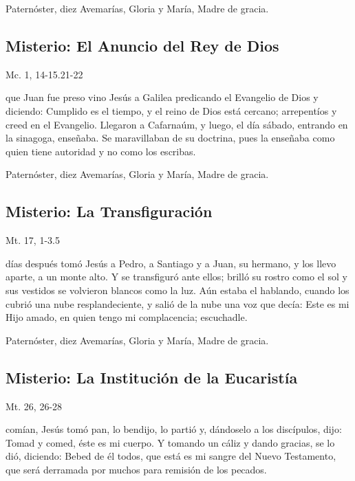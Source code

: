 \documentclass[./main.tex]{subfiles}
\newcounter{lux-counter}
\begin{document}
\begin{center}
      Paternóster, diez Avemarías, Gloria y María, Madre de gracia.
\end{center}

\subsection*{ Misterio: El Anuncio del Rey de Dios}
\begin{flushright}
      {\color{red}Mc. 1, 14-15.21-22}
\end{flushright}
 que Juan fue preso vino Jesús a Galilea predicando el Evangelio de Dios y diciendo: Cumplido es el tiempo, y el reino de Dios está cercano; 
arrepentíos y creed en el Evangelio. Llegaron a Cafarnaúm, y luego, el día sábado, entrando en la sinagoga, enseñaba. Se maravillaban de su doctrina, 
pues la enseñaba como quien tiene autoridad y no como los escribas.

\begin{center}
      Paternóster, diez Avemarías, Gloria y María, Madre de gracia.
\end{center}

\subsection*{ Misterio: La Transfiguración}
\begin{flushright}
      {\color{red}Mt. 17, 1-3.5}
\end{flushright}
 días después tomó Jesús a Pedro, a Santiago y a Juan, su hermano, y los llevo aparte, a un monte alto. Y se transfiguró ante ellos; 
brilló su rostro como el sol y sus vestidos se volvieron blancos como la luz. Aún estaba el hablando, cuando los cubrió una nube resplandeciente, 
y salió de la nube una voz que decía: Este es mi Hijo amado, en quien tengo mi complacencia; escuchadle.

\begin{center}
      Paternóster, diez Avemarías, Gloria y María, Madre de gracia.
\end{center}

\subsection*{ Misterio: La Institución de la Eucaristía}
\begin{flushright}
      {\color{red}Mt. 26, 26-28}
\end{flushright}
 comían, Jesús tomó pan, lo bendijo, lo partió y, dándoselo a los discípulos, dijo: Tomad y comed, éste es mi cuerpo. Y tomando un cáliz y dando gracias, 
se lo dió, diciendo: Bebed de él todos, que está es mi sangre del Nuevo Testamento, que será derramada por muchos para remisión de los pecados.
\end{document}
